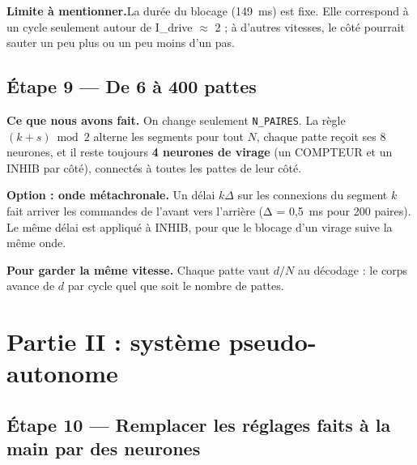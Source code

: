 \documentclass[11pt]{article}
\newcommand{\champ}[2]{\par\noindent\textbf{\color{bleu}#1} #2\par}
\newcommand{\attention}[2]{\par\noindent\colorbox{fondbloc}{\parbox{\dimexpr\linewidth-2\fboxsep}{%
  \textbf{\color{alerte}#1}\quad #2}}\par}
\newcommand{\code}[1]{\texttt{#1}}
\begin{document}
\attention{Limite à mentionner.}{La durée du blocage (149~ms) est fixe. Elle correspond à un cycle
seulement autour de I\_drive $\approx$ 2 ; à d'autres vitesses, le côté pourrait sauter un peu plus
ou un peu moins d'un pas.}

\subsection*{Étape 9 --- De 6 à 400 pattes}

\champ{Ce que nous avons fait.}{On change seulement \code{N\_PAIRES}. La règle $(k + s) \bmod 2$
alterne les segments pour tout $N$, chaque patte reçoit ses 8 neurones, et il reste toujours
\textbf{4 neurones de virage} (un COMPTEUR et un INHIB par côté), connectés à toutes les pattes de
leur côté.}
\champ{Option : onde métachronale.}{Un délai $k\Delta$ sur les connexions du segment $k$ fait
arriver les commandes de l'avant vers l'arrière (Δ = 0,5~ms pour 200 paires). Le même délai est
appliqué à INHIB, pour que le blocage d'un virage suive la même onde.}
\champ{Pour garder la même vitesse.}{Chaque patte vaut $d/N$ au décodage : le corps avance de $d$
par cycle quel que soit le nombre de pattes.}

\section{Partie II : système pseudo-autonome}

\subsection*{Étape 10 --- Remplacer les réglages faits à la main par des neurones}
\end{document}
